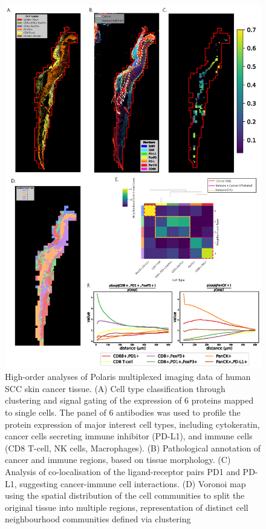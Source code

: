 \begin{figure}
    \centering
    \includegraphics[width=0.8\columnwidth]{Chapter3/Figures/Minh_figure3-01.png}
    \caption[Analyses of Polaris multiplexed imaging of human SCC skin cancer tissue. ]{High-order analyses of Polaris multiplexed imaging data of human SCC skin cancer tissue. (A) Cell type classification through clustering and signal gating of the expression of 6 proteins mapped to single cells. The panel of 6 antibodies was used to profile the protein expression of major interest cell types, including cytokeratin, cancer cells secreting immune inhibitor (PD-L1), and immune cells (CD8 T-cell, NK cells, Macrophages). (B) Pathological annotation of cancer and immune regions, based on tissue morphology. (C) Analysis of co-localisation of the ligand-receptor pairs PD1 and PD-L1, suggesting cancer-immune cell interactions. (D) Voronoi map using the spatial distribution of the cell communities to split the original tissue into multiple regions, representation of distinct cell neighbourhood communities defined via clustering}
    \label{fig:skin_cancer_polaris}
    
\end{figure}

